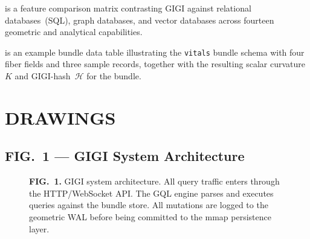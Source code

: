\documentclass[11pt,letterpaper]{article}
\begin{document}
\begin{description}[leftmargin=2.2em, labelwidth=2em]
  \item[\textbf{TABLE~III}] is a feature comparison matrix contrasting GIGI
    against relational databases~(SQL), graph databases, and vector databases
    across fourteen geometric and analytical capabilities.

  \item[\textbf{TABLE~IV}] is an example bundle data table illustrating the
    \texttt{vitals} bundle schema with four fiber fields and three sample
    records, together with the resulting scalar curvature~$K$ and
    GIGI-hash~$\mathcal{H}$ for the bundle.
\end{description}

\newpage
\section*{DRAWINGS}

\subsection*{FIG.\ 1 --- GIGI System Architecture}

\begin{figure}[h!]
\centering
{}
\caption*{\small\textbf{FIG.~1.} GIGI system architecture. All query traffic enters through the HTTP/WebSocket API. The GQL engine parses and executes queries against the bundle store. All mutations are logged to the geometric WAL before being committed to the mmap persistence layer.}
\end{figure}
\end{document}
